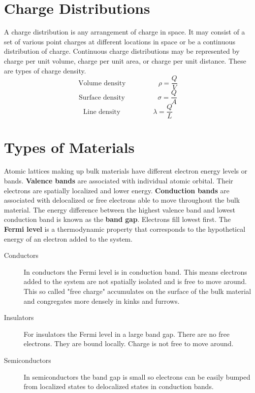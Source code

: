 
 
 \section{Charge Distributions}
 A charge distribution is any arrangement of charge in space.  It may consist of a set of various point charges at different locations in space or be a continuous distribution of charge.  Continuous charge distributions may be represented by charge per unit volume, charge per unit area, or charge per unit distance.  These are  types of charge density. 
 $$\text{Volume density} \hspace{2cm} \rho=\frac{Q}{V}$$
  $$\text{Surface density} \hspace{2cm} \sigma=\frac{Q}{A}$$
   $$\text{Line density} \hspace{2cm} \lambda=\frac{Q}{L}$$
   
 \section{Types of Materials}
Atomic lattices making up bulk materials have different electron energy levels or bands.  \textbf{Valence bands} are associated with individual atomic orbital.  Their electrons are spatially localized and lower energy.   \textbf{Conduction bands} are associated with delocalized or free electrons able to move throughout the bulk material.  The energy difference between the highest valence band and lowest conduction band is known as the \textbf{band gap}.  Electrons fill lowest first.  The \textbf{Fermi level} is a thermodynamic property that corresponds to the hypothetical energy of an electron added to the system.  
   
 \newpage  
   
 \begin{description}
  \item[Conductors] In conductors the Fermi level is in conduction band.  This means electrons added to the system are not spatially isolated and is free to move around.  This so called "free charge" accumulates on the surface of the bulk material and congregates more densely in kinks and furrows.
  \item[Insulators]  For insulators the Fermi level in a large band gap.  There are no free electrons.  They are bound locally.  Charge is not free to move around.
   \item[Semiconductors]  In semiconductors the band gap is small so electrons can be easily bumped from localized states to delocalized states in conduction bands.
\end{description}
  
